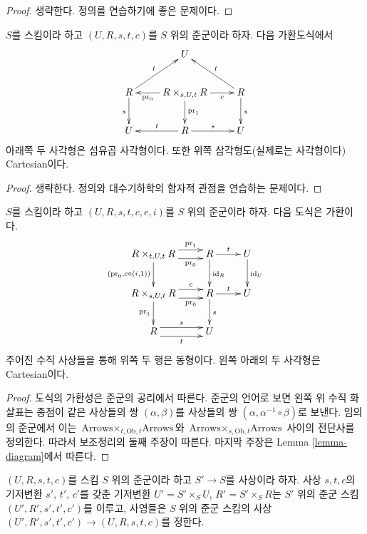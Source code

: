\begin{proof}
생략한다. 정의를 연습하기에 좋은 문제이다.
\end{proof}

\begin{lemma}
\label{lemma-diagram}
$S$를 스킴이라 하고 $(U, R, s, t, c)$를 $S$ 위의 준군이라 하자. 다음 가환도식에서
$$
\xymatrix{
& U & \\
R \ar[d]_s \ar[ru]^t &
R \times_{s, U, t} R
\ar[l]^-{\text{pr}_0} \ar[d]^{\text{pr}_1} \ar[r]_-c &
R \ar[d]^s \ar[lu]_t \\
U & R \ar[l]_t \ar[r]^s & U
}
$$
아래쪽 두 사각형은 섬유곱 사각형이다. 또한 위쪽 삼각형도(실제로는 사각형이다) Cartesian이다.
\end{lemma}

\begin{proof}
생략한다. 정의와 대수기하학의 함자적 관점을 연습하는 문제이다.
\end{proof}

\begin{lemma}
\label{lemma-diagram-pull}
$S$를 스킴이라 하고 $(U, R, s, t, c, e, i)$를 $S$ 위의 준군이라 하자. 다음 도식은 가환이다.
\begin{equation}
\label{equation-pull}
\xymatrix{
R \times_{t, U, t} R
\ar@<1ex>[r]^-{\text{pr}_1} \ar@<-1ex>[r]_-{\text{pr}_0}
\ar[d]_{(\text{pr}_0, c \circ (i, 1))} &
R \ar[r]^t \ar[d]^{\text{id}_R} &
U \ar[d]^{\text{id}_U} \\
R \times_{s, U, t} R
\ar@<1ex>[r]^-c \ar@<-1ex>[r]_-{\text{pr}_0} \ar[d]_{\text{pr}_1} &
R \ar[r]^t \ar[d]^s &
U \\
R \ar@<1ex>[r]^s \ar@<-1ex>[r]_t &
U
}
\end{equation}
주어진 수직 사상들을 통해 위쪽 두 행은 동형이다. 왼쪽 아래의 두 사각형은 Cartesian이다.
\end{lemma}

\begin{proof}
도식의 가환성은 준군의 공리에서 따른다. 준군의 언어로 보면 왼쪽 위 수직 화살표는 종점이 같은 사상들의 쌍
$(\alpha, \beta)$를 사상들의 쌍 $(\alpha, \alpha^{-1} \circ \beta)$로 보낸다. 임의의 준군에서 이는
$\text{Arrows} \times_{t, \text{Ob}, t} \text{Arrows}$와
$\text{Arrows} \times_{s, \text{Ob}, t} \text{Arrows}$ 사이의 전단사를 정의한다. 따라서 보조정리의 둘째 주장이 따른다.
마지막 주장은 Lemma \ref{lemma-diagram}에서 따른다.
\end{proof}

\begin{lemma}
\label{lemma-base-change-groupoid}
$(U, R, s, t, c)$를 스킴 $S$ 위의 준군이라 하고 $S' \to S$를 사상이라 하자. 사상 $s, t, c$의 기저변환
$s'$, $t'$, $c'$를 갖춘 기저변환 $U' = S' \times_S U$, $R' = S' \times_S R$는 $S'$ 위의 준군 스킴
$(U', R', s', t', c')$를 이루고, 사영들은 $S$ 위의 준군 스킴의 사상
$(U', R', s', t', c') \to (U, R, s, t, c)$를 정한다.
\end{lemma}

